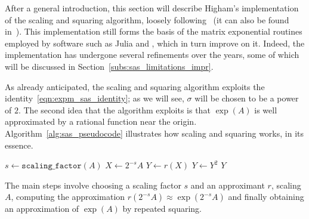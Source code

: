 After a general introduction, this section will describe Higham's implementation of the scaling and squaring algorithm, loosely following~\cite{higham:SaS_revisited} (it can also be found in~\cite[§~10.3]{higham:matfun_book}). This implementation still forms the basis of the matrix exponential routines employed by software such as Julia and \matlab{}, which in turn improve on it. Indeed, the implementation has undergone several refinements over the years, some of which will be discussed in Section~\ref{subs:sas_limitations_impr}.
\smallskip 

As already anticipated, the scaling and squaring algorithm exploits the identity~\eqref{eqn:expm_sas_identity}; as we will see, $\sigma$ will be chosen to be a power of $2$. The second idea that the algorithm exploits is that $\exp(A)$ is well approximated by a rational function near the origin. Algorithm~\ref{alg:sas_pseudocode} illustrates how scaling and squaring works, in its essence.
\begin{algorithm}[H]
	\centering
	\caption{\emph{High level description of the scaling and squaring method.}}
	\label{alg:sas_pseudocode}
	\begin{algorithmic}
		\State $s\gets\mathtt{scaling\_factor}(A)$
		\State $X\gets 2^{-s}A$
		\State $Y \gets r(X)$
			\State $Y\gets Y^2$
		\EndFor
		\State \Return $Y$
	\end{algorithmic}
\end{algorithm}
The main steps involve choosing a scaling factor $s$ and an approximant $r$, scaling $A$, computing the approximation $r(2^{-s}A)\approx\exp(2^{-s}A)$ and finally obtaining an approximation of $\exp(A)$ by repeated squaring.

